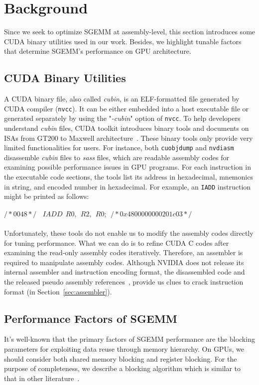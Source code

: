 \section{Background}
\label{sec:background}
Since we seek to optimize SGEMM at assembly-level, this section introduces some CUDA binary utilities used in our work. Besides, we highlight tunable factors that determine SGEMM's performance on GPU architecture.

\subsection{CUDA Binary Utilities}
\label{sec:cuda}

A CUDA binary file, also called {\em cubin}, is an ELF-formatted file generated by CUDA compiler ({\tt nvcc}). It can be either embedded into a host executable file or generated separately by using the "{\em -cubin}" option of {\tt nvcc}. To help developers understand {\em cubin} files, CUDA toolkit introduces binary tools and documents on ISAs from GT200 to Maxwell architecture~\cite{gtx980}. These binary tools only provide very limited functionalities for users. For instance, both {\tt cuobjdump} and {\tt nvdiasm} disassemble {\em cubin} files to {\em sass} files, which are readable assembly codes for examining possible performance issues in GPU programs. For each instruction in the executable code sections, the tools list its address in hexadecimal, mnemonics in string, and encoded number in hexadecimal. For example, an {\tt IADD} instruction might be printed as follows: \\\\
$/*0048*/~~~~IADD~~R0,~~R2,~~R0;~~/* 0x4800000000201c03 */$\\\\
Unfortunately, these tools do not enable us to modify the assembly codes directly for tuning performance. What we can do is to refine CUDA C codes after examining the read-only assembly codes iteratively. Therefore, an assembler is required to manipulate assembly codes. Although NVIDIA does not release its internal assembler and instruction encoding format, the disassembled code and the released pseudo assembly references~\cite{ptx2015isa}, provide us clues to crack instruction format (in Section~\ref{sec:assembler}).


\subsection{Performance Factors of SGEMM}
\label{sec:sgemm}
It's well-known that the primary factors of SGEMM performance are the blocking parameters for exploiting data reuse through memory hierarchy. On GPUs, we should consider both shared memory blocking and register blocking. For the purpose of completeness, we describe a blocking algorithm which is similar to that in other literature~\cite{magma,nervana_sgemm_wiki,lai,tan}.

